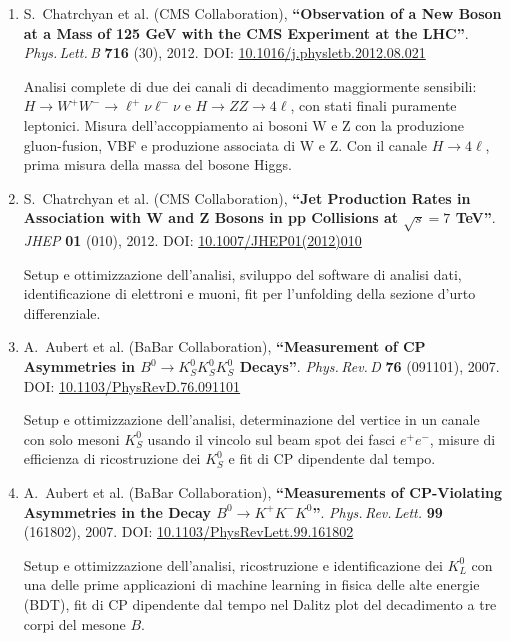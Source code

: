 \documentclass[11pt,twoside,a4paper]{article}
\begin{document}
\begin{enumerate}
\item S.~Chatrchyan et al. (CMS Collaboration), \textbf{``Observation of a New
  Boson at a Mass of 125 GeV with the CMS Experiment at the LHC''}.
  \textit{Phys.\,Lett.\,B} \textbf{716} (30), 2012. DOI:
  \href{https://www.sciencedirect.com/science/article/pii/S0370269312008581}{10.1016/j.physletb.2012.08.021}

  Analisi complete di due dei canali di decadimento maggiormente
  sensibili: $H \to W^+W^-\to \ell^+\nu\ell^-\nu$ e $H\to ZZ\to
  4\ell$, con stati finali puramente leptonici. Misura
  dell'accoppiamento ai bosoni W e Z con la produzione gluon-fusion,
  VBF e produzione associata di W e Z. Con il canale $H\to4\ell$,
  prima misura della massa del bosone Higgs.

\item S.~Chatrchyan et al. (CMS Collaboration), \textbf{``Jet
  Production Rates in Association with W and Z Bosons in pp Collisions
  at $\sqrt{s}=7$ TeV''}. \textit{JHEP} \textbf{01} (010), 2012. DOI:
  \href{https://link.springer.com/article/10.1007/JHEP01(2012)010}{10.1007/JHEP01(2012)010}

  Setup e ottimizzazione dell'analisi, sviluppo del software di
  analisi dati, identificazione di elettroni e muoni, fit per
  l'unfolding della sezione d'urto differenziale.

\item A.~Aubert et al. (BaBar Collaboration), \textbf{``Measurement of
  CP Asymmetries in $B^0 \to K^0_{S} K^0_{S} K^0_{S}$
  Decays''}. \textit{Phys.\,Rev.\,D} \textbf{76} (091101), 2007. DOI:
  \href{https://journals.aps.org/prd/abstract/10.1103/PhysRevD.76.091101}{10.1103/PhysRevD.76.091101}

  Setup e ottimizzazione dell'analisi, determinazione del vertice in
  un canale con solo mesoni $K^0_S$ usando il vincolo sul beam spot
  dei fasci $e^+e^-$, misure di efficienza di ricostruzione dei
  $K^0_S$ e fit di CP dipendente dal tempo.

\item A.~Aubert et al. (BaBar Collaboration), \textbf{``Measurements of
  CP-Violating Asymmetries in the Decay $B^0 \to K^{+} K^{-}
  K^0$''}. \textit{Phys.\,Rev.\,Lett.} \textbf{99} (161802), 2007. DOI:
  \href{https://journals.aps.org/prl/abstract/10.1103/PhysRevLett.99.161802}{10.1103/PhysRevLett.99.161802}

  Setup e ottimizzazione dell'analisi, ricostruzione e identificazione
  dei $K^0_L$ con una delle prime applicazioni di machine learning in
  fisica delle alte energie (BDT), fit di CP dipendente dal tempo nel
  Dalitz plot del decadimento a tre corpi del mesone $B$.
  
\end{enumerate}
\end{document}
